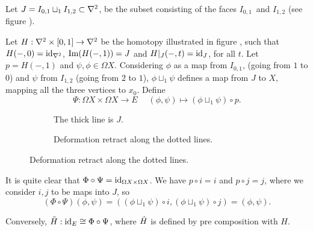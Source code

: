 \documentclass[a4paper,11pt,english]{article}
\begin{document}
\begin{exercise}[3]

Let $J = I_{0,1} \sqcup_1 I_{1,2} \subset \nabla^2$, be the subset consisting of
the faces $I_{0,1}$ and $I_{1,2}$ (see figure ).

Let $H: \nabla^2 \times [0,1] \to \nabla^2$ be the homotopy illustrated in figure
, such that $H(-,0) = \operatorname{id}_{\nabla^2}$, $\operatorname{Im}(H(-,1)) = J$ and
$H|_J(-,t) = \operatorname{id}_J$, for all $t$. Let $p = H(-,1)$ and $\psi, \phi \in \Omega
X$. Considering $\phi$ as a map from $I_{0,1}$, (going from $1$ to $0$) and
$\psi$ from $I_{1,2}$ (going from $2$ to $1$), $\phi \sqcup_1 \psi$ defines a
map from $J$ to $X$, mapping all the three vertices to $x_0$. Define 
\[ \Psi : \Omega X \times \Omega X \to E \; \quad (\phi, \psi) \mapsto
(\phi\sqcup_1 \psi) \circ p. \]

\begin{figure}[h]
\centering
\caption{}
\begin{subfigure}[b]{0.45\textwidth}
\centering

\caption{The thick line is $J$.}
\label{fig:1a}
\end{subfigure}
\begin{subfigure}[b]{0.45\textwidth}
\centering

\caption{Deformation retract along the dotted lines.}
\label{fig:1b}
\end{subfigure}
\end{figure}

It is quite clear that $\Phi \circ \Psi = \operatorname{id}_{\Omega X \times \Omega X}$. We
have $p \circ i = i$ and $p \circ j = j$, where we consider $i,j$ to be maps
into $J$, so 
\[  (\Phi \circ \Psi)(\phi, \psi) = ( (\phi \sqcup_1 \psi) \circ i, (\phi
\sqcup_1 \psi) \circ j ) = (\phi, \psi). \]

Conversely, $\tilde H : \operatorname{id}_E \cong \Phi \circ \Psi$, where $\tilde H$ is defined
by pre composition with $H$.

\end{exercise}
\end{document}
